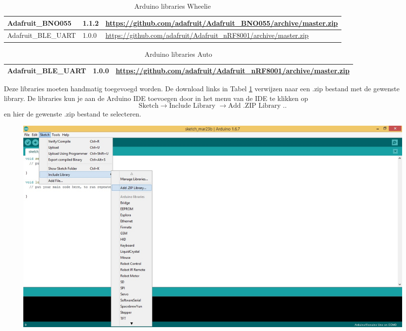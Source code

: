 \documentclass[12pt,a4paper]{article}
\begin{document}
\begin{table}[H]
	\begin{tabularx}{\textwidth}{|l|l|X|}
	\hline Adafruit\_BNO055 & 1.1.2 & \url{https://github.com/adafruit/Adafruit_BNO055/archive/master.zip} \\ 
	\hline Adafruit\_BLE\_UART & 1.0.0 & \url{https://github.com/adafruit/Adafruit_nRF8001/archive/master.zip }\\ 
	\hline		
	\end{tabularx} 
	\caption{Arduino libraries Wheelie}
	\label{tbl:Download_link}
\end{table}
\begin{table}[H]
	\begin{tabularx}{\textwidth}{|l|l|X|}
		\hline Adafruit\_BLE\_UART & 1.0.0 & \url{https://github.com/adafruit/Adafruit_nRF8001/archive/master.zip }\\ 
		\hline		
	\end{tabularx} 
	\caption{Arduino libraries Auto}
	\label{tbl:Download_link auto}
\end{table}

Deze libraries moeten handmatig toegevoegd worden. De download links in Tabel \ref{tbl:Download_link} verwijzen naar een .zip bestand met de gewenste library. De libraries kun je aan de Arduino IDE toevoegen door in het menu van de IDE te klikken op $$ \text{Sketch} \rightarrow \text{Include Library }\rightarrow \text{Add .ZIP Library ..}$$ en hier de gewenste .zip bestand te selecteren.
\begin{figure}[h]
\centering
\includegraphics[width=0.7\linewidth]{Add_ZIP}
\label{fig:Add_ZIP}
\end{figure}
\end{document}
